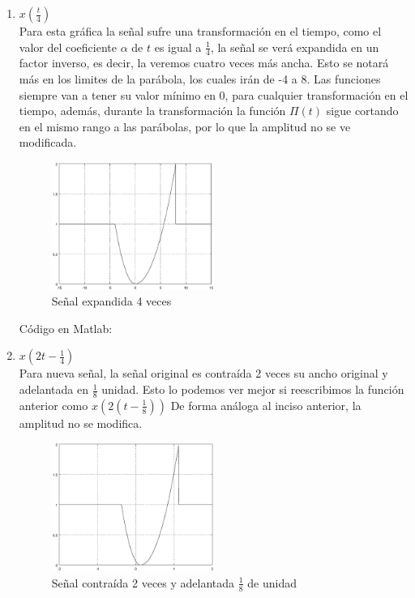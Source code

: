 \documentclass[10pt,a4paper]{report}
\begin{document}
\begin{enumerate}
  \item $x\left(\frac{t}{4}\right)$\\
  \newline Para esta gráfica la señal sufre una transformación en el tiempo, como el valor del coeficiente $\alpha$ de $t$ es igual a $\frac{1}{4}$, la señal se verá expandida en un factor inverso, es decir, la veremos cuatro veces más ancha. Esto se notará más en los limites de la parábola, los cuales irán de -4 a 8. Las funciones siempre van a tener su valor mínimo en 0, para cualquier transformación en el tiempo, además, durante la transformación la función $\Pi(t)$ sigue cortando en el mismo rango a las parábolas, por lo que la amplitud no se ve modificada.

    \begin{figure}[H]
      \begin{center}
        \includegraphics[width=0.5\textwidth]{Ejercicio2/IncisoA}
        \caption{Señal expandida 4 veces}
        \label{fig:IncisoA}
      \end{center}
    \end{figure}
    
Código en Matlab:
    

  \item $x\left(2t-\frac{1}{4}\right)$\\
    \newline Para nueva señal, la señal original es contraída 2 veces su ancho original y adelantada en $\frac{1}{8}$ unidad. Esto lo podemos ver mejor si reescribimos la función anterior como $x\left(2\left(t-\frac{1}{8}\right)\right)$ De forma análoga al inciso anterior, la amplitud no se modifica.

    \begin{figure}[H]
      \begin{center}
        \includegraphics[width=0.5\textwidth]{Ejercicio2/IncisoB}
        \caption{Señal contraída 2 veces y adelantada $\frac{1}{8}$ de unidad}
        \label{fig:IncisoB}
      \end{center}
    \end{figure}
    

\end{enumerate}
\end{document}
